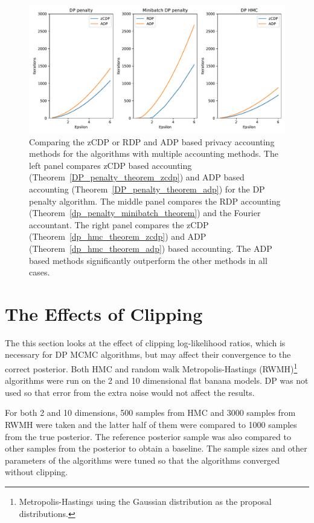 \documentclass[english,twoside,openright]{HYgraduMLDS}
\begin{document}
\begin{figure}[h]
	\centering
  \includegraphics[width=\textwidth]{figures/accountant_comparison}
  \caption{
    Comparing the zCDP or RDP and ADP based privacy accounting methods
    for the algorithms with multiple accounting methods. The left panel
    compares zCDP based accounting (Theorem~\ref{DP_penalty_theorem_zcdp})
    and ADP based accounting (Theorem~\ref{DP_penalty_theorem_adp}) for
    the DP penalty algorithm. The middle panel compares the RDP accounting
    (Theorem~\ref{dp_penalty_minibatch_theorem}) and the Fourier accountant.
    The right panel compares the zCDP (Theorem~\ref{dp_hmc_theorem_zcdp})
    and ADP (Theorem~\ref{dp_hmc_theorem_adp}) based accounting.
    The ADP based methods significantly outperform the other methods
    in all cases.
  }
  \label{accounting_comparison_fig}
\end{figure}

\section{The Effects of Clipping}\label{clipping_experiments}

The this section looks at the effect of clipping log-likelihood ratios,
which is necessary for DP MCMC algorithms, but may affect their convergence
to the correct posterior.
Both HMC and random walk Metropolis-Hastings (RWMH)\footnote{Metropolis-Hastings using the Gaussian
distribution as the proposal distributions.}
algorithms were run on the 2 and 10 dimensional flat banana models.
DP was not used so that error from the extra noise would not affect the results.

For both 2 and 10 dimensions, 500 samples from HMC and 3000 samples from
RWMH were taken and the latter half of them were
compared to 1000 samples from the true posterior. The reference posterior sample
was also compared to other samples from the posterior to obtain a baseline.
The sample sizes and other parameters of the algorithms were tuned so that
the algorithms converged without clipping.
\end{document}
